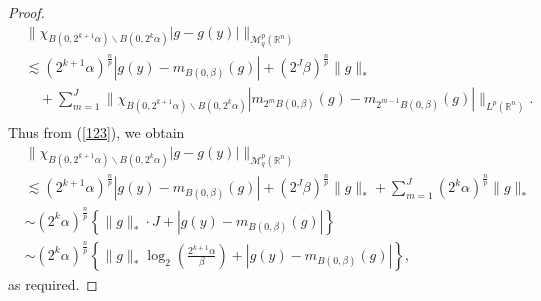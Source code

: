 \documentclass[10pt,a4paper]{amsart}
\begin{document}
\begin{proof}
	\begin{align*}
		&\| \chi_{B(0,2^{k+1}\alpha) \backslash B(0,2^k\alpha)} |g-g(y)| \|_{{\mathcal M}{}^p_q({\mathbb R}^n)}\\
		&\lesssim (2^{k+1}\alpha)^{\frac{n}{p}} |g(y)-m_{B(0,\beta)}(g)| + (2^J\beta)^{\frac{n}{p}} \|g\|_*\\
			& \quad + \sum_{m=1}^{J} \| \chi_{B(0,2^{k+1}\alpha) \backslash B(0,2^k\alpha)} |m_{2^mB(0,\beta)}(g)-m_{2^{m-1}B(0,\beta)}(g)| \|_{L^p({\mathbb R}^n)}.\\
	\end{align*}
	Thus from (\ref{123}), we obtain 
	\begin{align*}
		&\| \chi_{B(0,2^{k+1}\alpha) \backslash B(0,2^k\alpha)} |g-g(y)| \|_{{\mathcal M}{}^p_q({\mathbb R}^n)}\\
		&\lesssim (2^{k+1}\alpha)^{\frac{n}{p}} |g(y)-m_{B(0,\beta)}(g)| + (2^J\beta)^{\frac{n}{p}} \|g\|_* + \sum_{m=1}^{J}(2^k\alpha)^{\frac{n}{p}} \|g\|_* \\
		&\sim (2^k\alpha)^{\frac{n}{p}} \left\{ \|g\|_* \cdot J + |g(y) - m_{B(0,\beta)}(g)| \right\}\\
		&\sim (2^k\alpha)^{\frac{n}{p}} \left\{ \|g\|_* \log_2 \left(\frac{2^{k+1}\alpha}{\beta} \right) + |g(y) - m_{B(0,\beta)}(g)| \right\},
	\end{align*}
	as required.
\end{proof}
\end{document}
